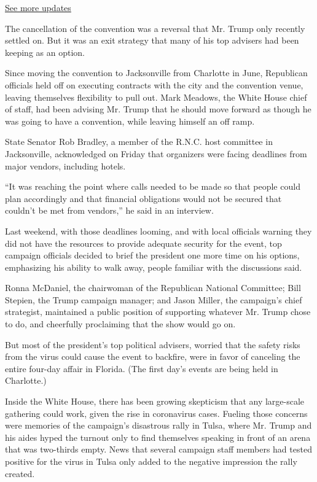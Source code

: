 \href{https://www.nytimes.com/2020/07/31/us/elections/biden-vs-trump.html?action=click\&pgtype=Article\&state=default\&region=MAIN_CONTENT_1\&context=storylines_live_updates}{See
more updates}

The cancellation of the convention was a reversal that Mr. Trump only
recently settled on. But it was an exit strategy that many of his top
advisers had been keeping as an option.

Since moving the convention to Jacksonville from Charlotte in June,
Republican officials held off on executing contracts with the city and
the convention venue, leaving themselves flexibility to pull out. Mark
Meadows, the White House chief of staff, had been advising Mr. Trump
that he should move forward as though he was going to have a convention,
while leaving himself an off ramp.

State Senator Rob Bradley, a member of the R.N.C. host committee in
Jacksonville, acknowledged on Friday that organizers were facing
deadlines from major vendors, including hotels.

``It was reaching the point where calls needed to be made so that people
could plan accordingly and that financial obligations would not be
secured that couldn't be met from vendors,'' he said in an interview.

Last weekend, with those deadlines looming, and with local officials
warning they did not have the resources to provide adequate security for
the event, top campaign officials decided to brief the president one
more time on his options, emphasizing his ability to walk away, people
familiar with the discussions said.

Ronna McDaniel, the chairwoman of the Republican National Committee;
Bill Stepien, the Trump campaign manager; and Jason Miller, the
campaign's chief strategist, maintained a public position of supporting
whatever Mr. Trump chose to do, and cheerfully proclaiming that the show
would go on.

But most of the president's top political advisers, worried that the
safety risks from the virus could cause the event to backfire, were in
favor of canceling the entire four-day affair in Florida. (The first
day's events are being held in Charlotte.)

Inside the White House, there has been growing skepticism that any
large-scale gathering could work, given the rise in coronavirus cases.
Fueling those concerns were memories of the campaign's disastrous rally
in Tulsa, where Mr. Trump and his aides hyped the turnout only to find
themselves speaking in front of an arena that was two-thirds empty. News
that several campaign staff members had tested positive for the virus in
Tulsa only added to the negative impression the rally created.

